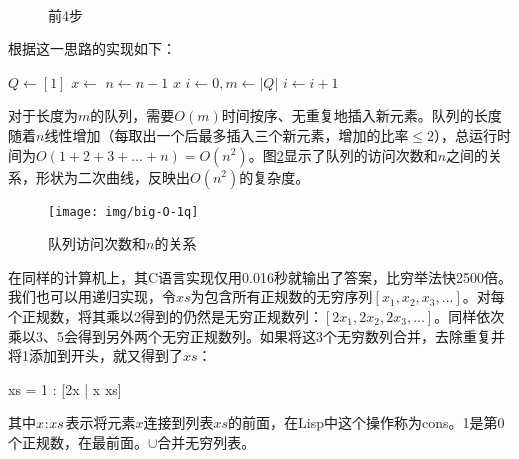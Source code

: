 \documentclass[b5paper]{ctexart}
\begin{document}
\begin{figure}[htbp]
  \centering
  \hspace{.1\textwidth}
  \\
  \hspace{.1\textwidth}
  \caption{前4步}
  \label{fig:queues}
\end{figure}

根据这一思路的实现如下：

\begin{algorithmic}[1]
  \State $Q \gets [1]$
    \State $x \gets$ 
    \State {}
    \State {}
    \State {}
    \State $n \gets n-1$
  \EndWhile
  \State \Return $x$
\EndFunction
\Statex
{}
  \State $i \gets 0, m \gets |Q|$
    \State $i \gets i + 1$
  \EndWhile
    \State {}
  \EndIf
\EndFunction
\end{algorithmic}

对于长度为$m$的队列，需要$O(m)$时间按序、无重复地插入新元素。队列的长度随着$n$线性增加（每取出一个后最多插入三个新元素，增加的比率$\leq 2$），总运行时间为$O(1 + 2 + 3 + ... + n) = O(n^2)$。图\ref{fig:big-O-1q}显示了队列的访问次数和$n$之间的关系，形状为二次曲线，反映出$O(n^2)$的复杂度。

\begin{figure}[htbp]
  \centering
  \texttt{[image: img/big-O-1q]}
  \caption{队列访问次数和$n$的关系}
  \label{fig:big-O-1q}
\end{figure}

在同样的计算机上，其C语言实现仅用0.016秒就输出了答案，比穷举法快2500倍。我们也可以用递归实现，令$xs$为包含所有正规数的无穷序列$[x_1, x_2, x_3, ...]$。对每个正规数，将其乘以2得到的仍然是无穷正规数列：$[2x_1, 2x_2, 2x_3, ...]$。同样依次乘以3、5会得到另外两个无穷正规数列。如果将这3个无穷数列合并，去除重复并将1添加到开头，就又得到了$xs$：

\be
  xs = 1 : [2x | x \gets xs] \cup [3x | x \gets xs] \cup [5x | x \gets xs]
\ee

其中$x \mathbin{\!:\!} xs$表示将元素$x$连接到列表$xs$的前面，在Lisp中这个操作称为cons。1是第0个正规数，在最前面。$\cup$合并无穷列表。
\end{document}
